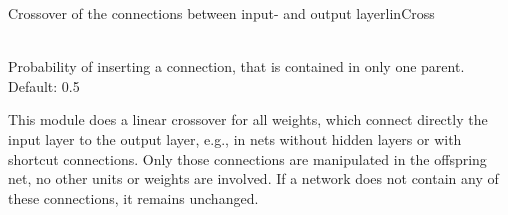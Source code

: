 \begin{moduledoc}{Crossover of the connections between input- and output layer}{linCross}

\item[\KeyWord{probCross} \optParam{ x } ]~\\
    Probability of inserting a connection, that is contained in only one parent.
    Default: 0.5 
\end{moduledoc}


This module does a linear crossover for all weights, which connect
directly the input layer to the output layer, e.g., in nets without
hidden layers or with shortcut connections.
Only those connections are manipulated in the offspring net, no other
units or weights are involved.
If a network does not contain any of these connections, it remains
unchanged.

